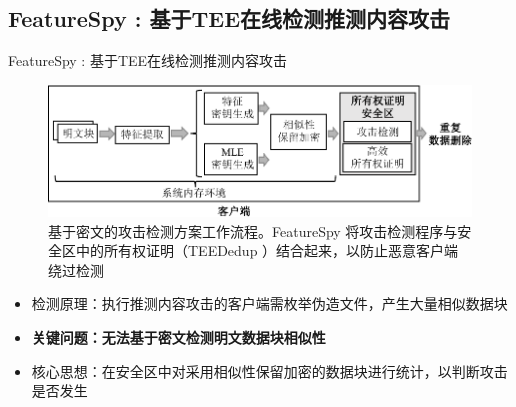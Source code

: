 \documentclass{beamer}
\newcommand{\sysnameS}{TEEDedup }
\newcommand{\sysnameF}{FeatureSpy }
\begin{document}
\subsection{\sysnameF: 基于TEE在线检测推测内容攻击}

\begin{frame}{\sysnameF: 基于TEE在线检测推测内容攻击}
    \begin{figure}[!htb]
        \centering
        \includegraphics[width=\textwidth]{../pic/featurespy/architecture.pdf}
        \caption{基于密文的攻击检测方案工作流程。\sysnameF 将攻击检测程序与安全区中的所有权证明（\sysnameS ）结合起来，以防止恶意客户端绕过检测}
        \label{fig:featurespy-architecture-secure}
    \end{figure}
    \vspace{-1em}
    \begin{itemize}
        \item 检测原理：执行推测内容攻击的客户端需枚举伪造文件，产生大量相似数据块
        \item {\bf 关键问题：无法基于密文检测明文数据块相似性}
        \item 核心思想：在安全区中对采用相似性保留加密的数据块进行统计，以判断攻击是否发生
    \end{itemize}
\end{frame}
\end{document}
